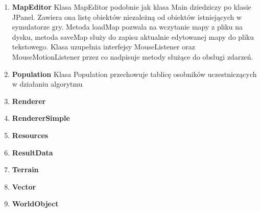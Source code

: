 \begin{par}
\begin{enumerate}
	\item{\bf MapEditor }\newline
	Klasa MapEditor podobnie jak klasa Main dziedziczy po klasie JPanel. Zawiera ona listę obiektów niezależną od obiektów istniejących w symulatorze gry. Metoda loadMap pozwala na wczytanie mapy z pliku na dysku, metoda saveMap służy do zapisu aktualnie edytowanej mapy do pliku tekstowego. Klasa uzupełnia interfejsy MouseListener oraz MouseMotionListener przez co nadpisuje metody służące do obsługi zdarzeń. 
	\item{\bf Population }\newline
	Klasa Population przechowuje tablicę osobników uczestniczących w działaniu algorytmu
	\item{\bf Renderer }\newline
	\item{\bf RendererSimple }\newline
	\item{\bf Resources }\newline
	\item{\bf ResultData }\newline
	\item{\bf Terrain }\newline
	\item{\bf Vector }\newline
	\item{\bf WorldObject }\newline
	\end{enumerate}


\end{par}


